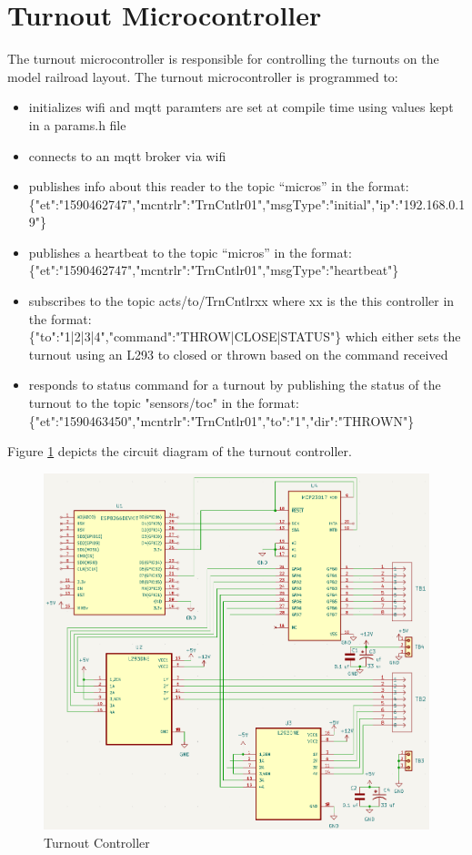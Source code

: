 \section{Turnout Microcontroller}
\label{sec:turnout-microcontroller}
The turnout microcontroller is responsible for controlling the turnouts on the model railroad layout. The turnout microcontroller is programmed to:
\begin{itemize}
    \item initializes \gls{wifi} and \gls{mqtt} paramters are set at compile time using values kept in a params.h file
    \item connects to an \gls{mqtt} broker via \gls{wifi}
    \item publishes info about this reader to the topic ``micros'' in the format: \\
    \{"et":"1590462747","mcntrlr":"TrnCntlr01","msgType":"initial","ip":"192.168.0.19"\}
    \item publishes a heartbeat to the topic ``micros'' in the format: \\
    \{"et":"1590462747","mcntrlr":"TrnCntlr01","msgType":"heartbeat"\}
    \item subscribes to the topic acts/to/TrnCntlrxx where xx is the this controller in the format: \\
    \{"to":"1|2|3|4","command":"THROW|CLOSE|STATUS"\} which either sets the turnout using an L293 to closed or thrown based on the command received
    \item responds to status command for a turnout by publishing the status of the turnout to the topic "sensors/toc" in the format: \\
    \{"et":"1590463450","mcntrlr":"TrnCntlr01","to":"1","dir":"THROWN"\}
\end{itemize}

Figure \ref{fig:turnout-controller} depicts the circuit diagram of the turnout controller.

\begin{figure}[htbp]
    \centering
    \includegraphics[width=\textwidth]{turnout-controller.png}
    \caption{Turnout Controller}
    \label{fig:turnout-controller}
\end{figure}
